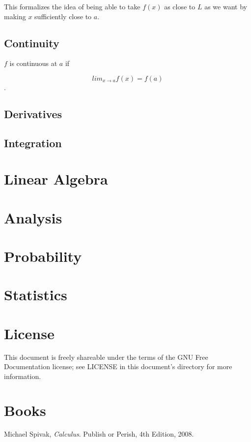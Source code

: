 \documentclass{article}
\begin{document}
This formalizes the idea of being able to take $f(x)$ as close to $L$ as we want
by making $x$ sufficiently close to $a$.

\subsection{Continuity}

\begin{definition}

$f$ is continuous at $a$ if

\begin{equation}
lim_{x \to a} f(x) = f(a)
\end{equation}.

\end{definition}

\subsection{Derivatives}

\subsection{Integration}

\section{Linear Algebra}

\section{Analysis}

\section{Probability}

\section{Statistics}

\section{License}

This document is freely shareable under the terms of the GNU Free Documentation
license; see LICENSE in this document's directory for more information.

\section{Books}

\begin{thebibliography}{9}

  Michael Spivak,
  \emph{Calculus}.
  Publish or Perish,
  4th Edition,
  2008.

\end{thebibliography}
\end{document}
